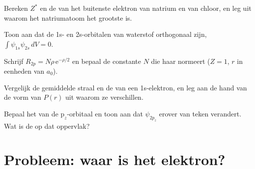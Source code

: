 \begin{exercise}[$\star\star$]\label{exo:b2:atomic-orbitals:8}
Bereken $Z^*$ en de  van het buitenste elektron van natrium en van
chloor, en leg uit waarom het natriumatoom het grootste is.
\end{exercise}

\begin{exercise}[$\star\star$]\label{exo:b2:atomic-orbitals:9}
Toon aan dat de 1s- en 2s-orbitalen van waterstof orthogonaal zijn,
$\int\psi_{1s}\psi_{2s}\,dV = 0$.
\end{exercise}

\begin{exercise}[$\star\star\star$]\label{exo:b2:atomic-orbitals:10}
Schrijf $R_{2p} = N\rho\,\mathrm e^{-\rho/2}$ en bepaal de constante $N$ die haar normeert
($Z = 1$, $r$ in eenheden van $a_0$).
\end{exercise}

\begin{exercise}[$\star\star\star$]\label{exo:b2:atomic-orbitals:11}
Vergelijk de gemiddelde straal en de  van een 1s-elektron, en
leg aan de hand van de vorm van $P(r)$ uit waarom ze verschillen.
\end{exercise}

\begin{exercise}[$\star\star\star$]\label{exo:b2:atomic-orbitals:12}
Bepaal het  van de $\mathrm p_z$-orbitaal en toon aan dat $\psi_{2p_z}$
erover van teken verandert. Wat is de  op dat oppervlak?
\end{exercise}

\section{Probleem: waar is het elektron?}

